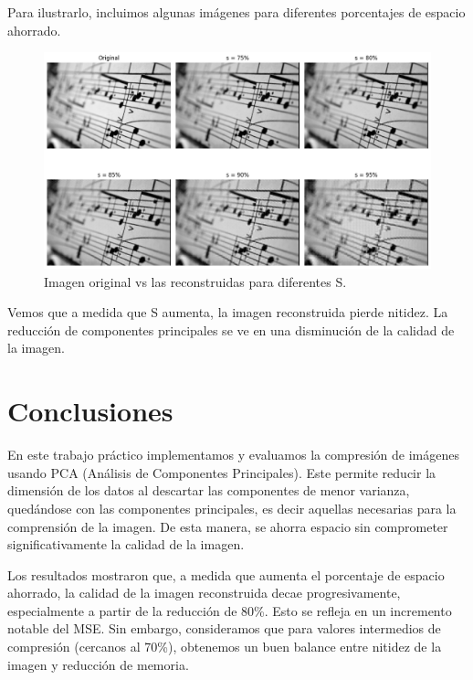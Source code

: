 \documentclass[a4paper,12pt]{article}
\begin{document}
Para ilustrarlo, incluimos algunas imágenes para diferentes porcentajes de espacio ahorrado. 
\begin{figure}[H]
    \centering
    \includegraphics[width=1\textwidth]{Ejercicio 4b.png}
    \caption{Imagen original vs las reconstruidas para diferentes S.}
    \label{fig:ej4b}
\end{figure}

Vemos que a medida que S aumenta, la imagen reconstruida pierde nitidez. La reducción de 
componentes principales se ve en una disminución de la calidad de la imagen. 

\newpage
\section*{Conclusiones}
En este trabajo práctico implementamos y evaluamos la compresión de imágenes usando 
PCA (Análisis de Componentes Principales). Este permite reducir la dimensión de los datos
al descartar las componentes de menor varianza, quedándose con las componentes principales, 
es decir aquellas necesarias para la comprensión de la imagen. De esta manera, se ahorra espacio 
sin comprometer significativamente la calidad de la imagen.

\vspace{1em}

Los resultados mostraron que, a medida que aumenta el porcentaje de espacio ahorrado, la calidad
de la imagen reconstruida decae progresivamente, especialmente a partir de la reducción de 80\%. 
Esto se refleja en un incremento notable del MSE. Sin embargo, consideramos que
para valores intermedios de compresión (cercanos al 70\%), obtenemos un buen balance entre nitidez 
de la imagen y reducción de memoria. 

\vspace{1em}
\end{document}
